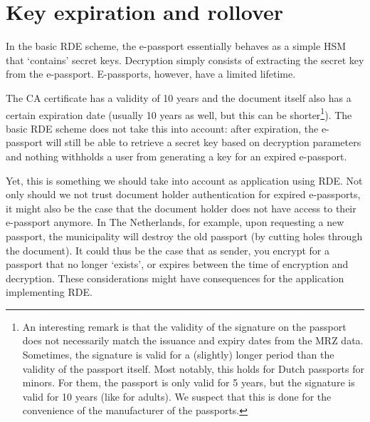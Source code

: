 \section{Key expiration and rollover}\label{sec:key-expiration-and-rollover}
In the basic RDE scheme, the e-passport essentially behaves as a simple HSM that `contains' secret keys.
Decryption simply consists of extracting the secret key from the e-passport.
E-passports, however, have a limited lifetime.

The CA certificate has a validity of 10 years and the document itself also has a certain expiration date (usually 10 years as well, but this can be shorter\footnote{
An interesting remark is that the validity of the signature on the passport does not necessarily match the issuance and expiry dates from the MRZ data.
Sometimes, the signature is valid for a (slightly) longer period than the validity of the passport itself.
Most notably, this holds for Dutch passports for minors.
For them, the passport is only valid for 5 years, but the signature is valid for 10 years (like for adults).
We suspect that this is done for the convenience of the manufacturer of the passports.
}).
The basic RDE scheme does not take this into account: after expiration, the e-passport will still be able to retrieve a secret key based on decryption parameters and nothing withholds a user from generating a key for an expired e-passport.

Yet, this is something we should take into account as application using RDE.
Not only should we not trust document holder authentication for expired e-passports, it might also be the case that the document holder does not have access to their e-passport anymore.
In The Netherlands, for example, upon requesting a new passport, the municipality will destroy the old passport (by cutting holes through the document).
It could thus be the case that as sender, you encrypt for a passport that no longer `exists', or expires between the time of encryption and decryption.
These considerations might have consequences for the application implementing RDE.

